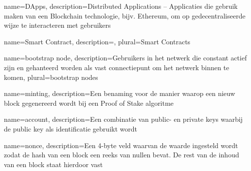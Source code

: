 

 {
  name={DApps},
  description={Distributed Applications -- Applicaties die gebruik maken van een Blockchain technologie, bijv. Ethereum, om op gedecentraliseerde wijze te interacteren met gebruikers}
}

 {
  name={Smart Contract},
  description={},
  plural={Smart Contracts}
}



 {
  name={bootstrap node},
  description={Gebruikers in het netwerk die constant actief zijn en gehanteerd worden als vast connectiepunt om het netwerk binnen te komen},
  plural={bootstrap nodes}
}

 {
  name={minting},
  description={Een benaming voor de manier waarop een nieuw block gegenereerd wordt bij een Proof of Stake algoritme}
}

 {
  name={account},
  description={Een combinatie van public- en private keys waarbij de public key als identificatie gebruikt wordt}
}




 {
  name={nonce},
  description={Een 4-byte veld waarvan de waarde ingesteld wordt zodat de hash van een block een reeks van nullen bevat. De rest van de inhoud van een block staat hierdoor vast}
}



